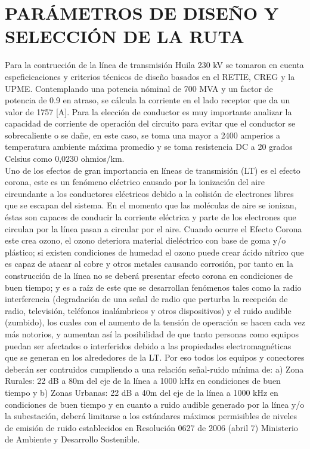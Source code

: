 \section{PARÁMETROS DE DISEÑO Y SELECCIÓN DE LA RUTA}

Para la contrucción de la línea de transmisión Huila 230 kV se tomaron en cuenta espeficicaciones y criterios técnicos de diseño basados en el RETIE, CREG y la UPME. Contemplando una potencia nóminal de 700 MVA y un factor de potencia de 0.9 en atraso, se cálcula la corriente en el lado receptor que da un valor de 1757 [A]. Para la elección de conductor es muy importante analizar la capacidad de corriente de operación del circuito para evitar que el conductor se sobrecaliente o se dañe, en este caso, se toma una mayor a 2400 amperios a temperatura ambiente máxima promedio y se toma resistencia DC a 20 grados Celsius como 0,0230 ohmios/km.\\
Uno de los efectos de gran importancia en líneas de transmisión (LT) es el efecto corona, este es un fenómeno eléctrico causado por la ionización del aire circundante a los conductores eléctricos debido a la colisión de electrones libres que se escapan del sistema. En el momento que las moléculas de aire se ionizan, éstas son capaces de conducir la corriente eléctrica y parte de los electrones que circulan por la línea pasan a circular por el aire. Cuando ocurre el Efecto Corona este crea ozono, el ozono deteriora material dieléctrico con base de goma y/o plástico; si existen condiciones de humedad el ozono puede crear ácido nítrico que es capaz de atacar al cobre y otros metales causando corrosión, por tanto en la construcción de la línea no se deberá presentar efecto corona en condiciones de buen tiempo; y es a raíz de este que se desarrollan fenómenos tales como la radio interferencia (degradación de una señal de radio que perturba la recepción de radio, televisión, teléfonos inalámbricos y otros dispositivos) y el ruido audible (zumbido), los cuales con el aumento de la tensión de operación se hacen cada vez más notorios, y aumentan así la posibilidad de que tanto personas como equipos puedan ser afectados o interferidos debido a las propiedades electromagnéticas que se generan en los alrededores de la LT. Por eso todos los equipos y conectores deberán ser contruidos cumpliendo a una relación señal-ruido mínima de: a) Zona Rurales: 22 dB a 80m del eje de la línea a 1000 kHz en condiciones de buen tiempo y b) Zonas Urbanas: 22 dB a 40m del eje de la línea a 1000 kHz en condiciones de buen tiempo y en cuanto a ruido audible generado por la línea y/o la subestación, deberá limitarse a los estándares máximos permisibles de niveles de emisión de ruido establecidos en Resolución 0627 de 2006 (abril 7) Ministerio de Ambiente y Desarrollo Sostenible.\\
